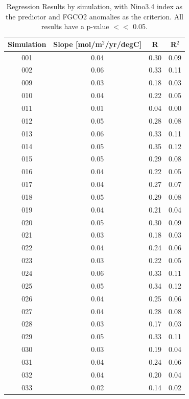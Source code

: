 \documentclass[12pt]{article}
\begin{document}
\newpage
\begin{table}[!h]
\centering
\caption{Regression Results by simulation, with Nino3.4 index as the predictor and FGCO2 anomalies as the criterion. All results have a p-value $<<$ 0.05.}
\begin{tabular}{c | c c c}
	\toprule
	\textbf{Simulation} &  \textbf{Slope} [mol/m$^{2}$/yr/degC] &  \textbf{R} &  \textbf{R$^{2}$} \\
	\midrule
	001 &   0.04 &     0.30 &       0.09 \\
	002 &   0.06 &     0.33 &       0.11 \\
	009 &   0.03 &     0.18 &       0.03 \\
	010 &   0.04 &     0.22 &       0.05 \\
	011 &   0.01 &     0.04 &       0.00 \\
	012 &   0.05 &     0.28 &       0.08 \\
	013 &   0.06 &     0.33 &       0.11 \\
	014 &   0.05 &     0.35 &       0.12 \\
	015 &   0.05 &     0.29 &       0.08 \\
	016 &   0.04 &     0.22 &       0.05 \\
	017 &   0.04 &     0.27 &       0.07 \\
	018 &   0.05 &     0.29 &       0.08 \\
	019 &   0.04 &     0.21 &       0.04 \\
	020 &   0.05 &     0.30 &       0.09 \\
	021 &   0.03 &     0.18 &       0.03 \\
	022 &   0.04 &     0.24 &       0.06 \\
	023 &   0.03 &     0.22 &       0.05 \\
	024 &   0.06 &     0.33 &       0.11 \\
	025 &   0.05 &     0.34 &       0.12 \\
	026 &   0.04 &     0.25 &       0.06 \\
	027 &   0.04 &     0.28 &       0.08 \\
	028 &   0.03 &     0.17 &       0.03 \\
	029 &   0.05 &     0.33 &       0.11 \\
	030 &   0.03 &     0.19 &       0.04 \\
	031 &   0.04 &     0.24 &       0.06 \\
	032 &   0.04 &     0.20 &       0.04 \\
	033 &   0.02 &     0.14 &       0.02 \\

\end{tabular}
\end{table}
\end{document}
